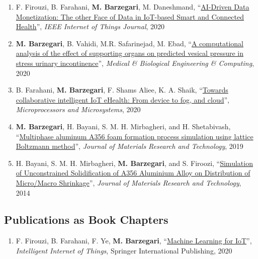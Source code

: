 \documentclass{cv}
\begin{document}
\begin{enumerate}[itemsep=-0.2ex]
\item
F. Firouzi, B. Farahani, \textbf{M. Barzegari}, M. Daneshmand, ``\href{https://doi.org/10.1109/JIOT.2020.3027971}{AI-Driven Data Monetization: The other Face of Data in IoT-based Smart and Connected Health}'', \textit{IEEE Internet of Things Journal}, 2020
\item
\textbf{M. Barzegari}, B. Vahidi, M.R. Safarinejad, M. Ebad, ``\href{https://doi.org/10.1007/s11517-020-02148-2}{A computational analysis of the effect of supporting organs on predicted vesical pressure in stress urinary incontinence}'', \textit{Medical \& Biological Engineering \& Computing}, 2020
\item
B. Farahani, \textbf{M. Barzegari}, F. Shams Aliee, K. A. Shaik, ``\href{https://doi.org/10.1016/j.micpro.2019.102938}{Towards collaborative intelligent IoT eHealth: From device to fog, and cloud}'', \textit{Microprocessors and Microsystems}, 2020
\item
\textbf{M. Barzegari}, H. Bayani, S. M. H. Mirbagheri, and H. Shetabivash, ``\href{https://doi.org/10.1016/j.jmrt.2018.03.010}{Multiphase aluminum A356 foam formation process simulation using lattice Boltzmann method}'', \textit{Journal of Materials Research and Technology}, 2019
\item
H. Bayani, S. M. H. Mirbagheri, \textbf{M. Barzegari}, and S. Firoozi, ``\href{http://www.sciencedirect.com/science/article/pii/S2238785413001129}{Simulation of Unconstrained Solidification of A356 Aluminium Alloy on Distribution of Micro/Macro Shrinkage}'', \textit{Journal of Materials Research and Technology}, 2014
\end{enumerate}

\subsection{Publications as Book Chapters}

\begin{enumerate}[itemsep=-0.2ex]
\item
F. Firouzi, B. Farahani, F. Ye, \textbf{M. Barzegari}, ``\href{https://link.springer.com/chapter/10.1007\%2F978-3-030-30367-9_5}{Machine Learning for IoT}'', \textit{Intelligent Internet of Things}, Springer International Publishing, 2020
\end{enumerate}
\end{document}
